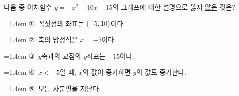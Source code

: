 다음 중 이차함수 $y=-x^2-10x-15$의 그래프에 대한 설명으로 옳지 \underline{않은} 것은?
\par\medskip\par\noindent\hangindent=1.4em {\small ①}\ 꼭짓점의 좌표는 $(-5{,}\mkern3mu\mathopen{}10)$이다.\par\noindent\hangindent=1.4em {\small ②}\ 축의 방정식은 $x=-5$이다.\par\noindent\hangindent=1.4em {\small ③}\ $y$축과의 교점의 $y$좌표는 $-15$이다.\par\noindent\hangindent=1.4em {\small ④}\ $x<-5$일 때, $x$의 값이 증가하면 $y$의 값도 증가한다.\par\noindent\hangindent=1.4em {\small ⑤}\ 모든 사분면을 지난다.\par\medskip
